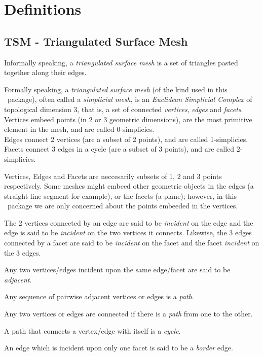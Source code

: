 \section{Definitions}

\subsection{TSM - Triangulated Surface Mesh}

Informally speaking, a {\em triangulated surface mesh} is a set of triangles pasted together along their edges.

Formally speaking, a {\em triangulated surface mesh} (of the kind used in this \cgal\ package), often called a {\em simplicial mesh}, is an {\em Euclidean Simplicial Complex} of topological dimension 3, that is, a set of connected {\em vertices}, {\em edges} and {\em facets}.\\
Vertices embeed points (in 2 or 3 geometric dimensions), are the most primitive element in the mesh, and are called 0-simplicies.\\
Edges connect 2 vertices (are a subset of 2 points), and are called 1-simplicies.\\
Facets connect 3 edges in a cycle (are a subset of 3 points), and are called 2-simplicies.

Vertices, Edges and Facets are neccesarily subsets of 1, 2 and 3 points respectively. Some meshes might embeed other geometric objects in the edges (a straight line segment for example), or the facets (a plane); however, in this \cgal\ package we are only concerned about the points embeeded in the vertices.

The 2 vertices connected by an edge are said to be {\em incident} on the edge and the edge is said to be {\em incident} on the two vertices it connects. Likewise, the 3 edges connected by a facet are said to be {\em incident} on the facet and the facet {\em incident} on the 3 edges.

Any two vertices/edges incident upon the same edge/facet are said to be {\em adjacent}.

Any sequence of pairwise adjacent vertices or edges is a {\em path}.

Any two vertices or edges are connected if there is a {\em path} from one to the other.

A path that connects a vertex/edge with itself is a {\em cycle}.

An edge which is incident upon only one facet is said to be a {\em border} edge. 

